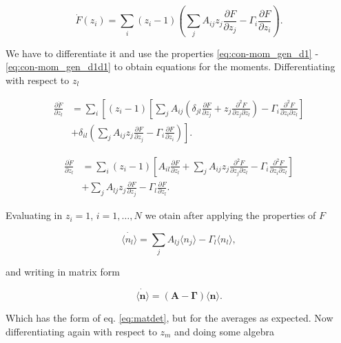 \begin{equation}
\label{eq:momg}
\dot{F}(z_i) = \sum_i(z_i-1)\left(\sum_jA_{ij} z_j \frac{\partial F}{\partial z_j} - \Gamma_i\frac{\partial F}{\partial z_i}\right).
\end{equation}

We have to differentiate it and use the properties \eqref{eq:con-mom_gen_d1} - \eqref{eq:con-mom_gen_d1d1} to obtain equations for the moments. Differentiating with respect to $z_l$

\begin{equation*}
\begin{split}
\frac{\partial \dot{F}}{\partial z_l} &= \sum_i\left[(z_i-1)\left[\sum_jA_{ij}\left(\delta_{jl}\frac{\partial F}{\partial z_j}+z_j\frac{\partial^2 F}{\partial z_j\partial z_l}\right)-\Gamma_i\frac{\partial^2 F}{\partial z_i\partial z_l}\right]\right.\\
&+\left.\delta_{il}\left(\sum_jA_{ij}z_j\frac{\partial F}{\partial z_j}-\Gamma_i\frac{\partial F}{\partial z_i}\right)\right].
\end{split}
\end{equation*}

\begin{equation*}
\begin{split}
\frac{\partial \dot{F}}{\partial z_l} &= \sum_i(z_i-1)\left[A_{il}\frac{\partial F}{\partial z_l}+\sum_jA_{ij}z_j\frac{\partial^2 F}{\partial z_j\partial z_l}-\Gamma_i\frac{\partial^2 F}{\partial z_i\partial z_l}\right]\\
&+\sum_jA_{lj}z_j\frac{\partial F}{\partial z_j}-\Gamma_l\frac{\partial F}{\partial z_l}.
\end{split}
\end{equation*}

Evaluating in $z_i=1$, $i=1,\dotsc,N$ we otain after applying the properties of $F$

\begin{equation*}
\dot{\langle n_l \rangle} = \sum_jA_{lj}\langle n_j\rangle-\Gamma_l\langle n_l\rangle,
\end{equation*}

and writing in matrix form

\begin{equation}
  \label{eq:mas-general_ave}
  \dot{\langle \mathbf{n}\rangle} = (\mathbf{A}-\mathbf{\Gamma})\langle \mathbf{n}\rangle.
\end{equation}

Which has the form of eq. \eqref{eq:matdet}, but for the averages as expected. Now differentiating again with respect to $z_m$ and doing some algebra

